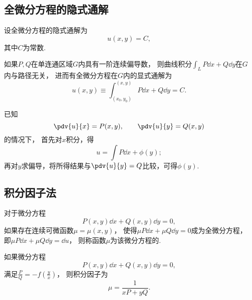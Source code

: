 \subsection{全微分方程的隐式通解}
设全微分方程的隐式通解为\begin{equation*}
	u(x,y) = C,
\end{equation*}
其中\(C\)为常数.

如果\(P,Q\)在单连通区域\(G\)内具有一阶连续偏导数，
则曲线积分\(\int_L P\dd{x}+Q\dd{y}\)在\(G\)内与路径无关，
进而有全微分方程在\(G\)内的显式通解为\begin{equation*}
	u(x,y) \equiv \int_{(x_0,y_0)}^{(x,y)} P\dd{x}+Q\dd{y} = C.
\end{equation*}

已知\begin{equation*}
	\pdv{u}{x} = P(x,y),
	\qquad
	\pdv{u}{y} = Q(x,y)
\end{equation*}的情况下，
首先对\(x\)积分，得\begin{equation*}
	u = \int P \dd{x} + \phi(y);
\end{equation*}
再对\(y\)求偏导，将所得结果与\(\pdv{u}{y} = Q\)比较，可得\(\phi(y)\).

\subsection{积分因子法}
对于微分方程\begin{equation*}
	P(x,y)\dd{x} + Q(x,y)\dd{y} = 0,
\end{equation*}
如果存在连续可微函数\(\mu=\mu(x,y)\)，
使得\(\mu P \dd{x} + \mu Q \dd{y} = 0\)成为全微分方程，
即\(\mu P \dd{x} + \mu Q \dd{y} = \dd{u}\)，
则称函数\(\mu\)为该微分方程的.

如果微分方程\begin{equation*}
	P(x,y)\dd{x} + Q(x,y)\dd{y} = 0,
\end{equation*}
满足\(\frac{P}{Q}=-f\left(\frac{y}{x}\right)\)，
则积分因子为\begin{equation*}
	\mu = \frac{1}{xP+yQ}.
\end{equation*}
